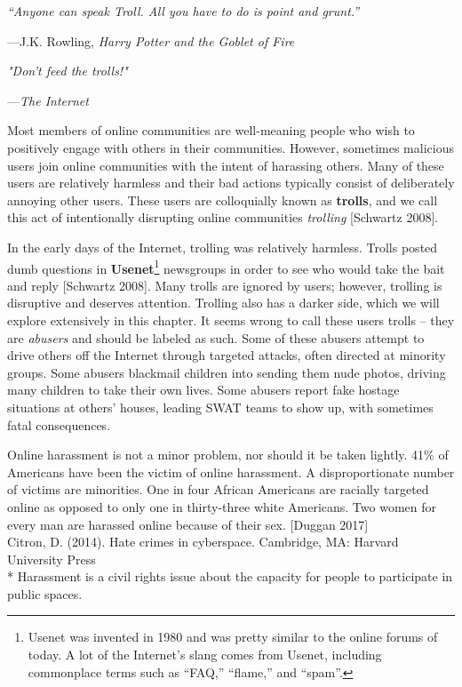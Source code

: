 \documentclass[class=book, crop=false]{standalone}
\providecommand{\keyterm}[1]{\textbf{#1}\marginnote{\scriptsize \textbf{#1}}}
\begin{document}
\epigraph{\itshape “Anyone can speak Troll. All you have to do is point and grunt.”}{---J.K. Rowling, \textit{Harry Potter and the Goblet of Fire}}

\epigraph{\itshape "Don't feed the trolls!"}{---\textit{The Internet}}

Most members of online communities are well-meaning people who wish to positively engage with others in their communities. However, sometimes malicious users join online communities with the intent of harassing others. Many of these users are relatively harmless and their bad actions typically consist of deliberately annoying other users. These users are colloquially known as \keyterm{trolls}, and we call this act of intentionally disrupting online communities \textit{trolling} [Schwartz 2008].

In the early days of the Internet, trolling was relatively harmless. Trolls posted dumb questions in \keyterm{Usenet}\footnote{Usenet was invented in 1980 and was pretty similar to the online forums of today. A lot of the Internet’s slang comes from Usenet, including commonplace terms such as “FAQ,” “flame,” and “spam”.} newsgroups in order to see who would take the bait and reply [Schwartz 2008]. Many trolls are ignored by users; however, trolling is disruptive and deserves attention. Trolling also has a darker side, which we will explore extensively in this chapter. It seems wrong to call these users trolls -- they are \textit{abusers} and should be labeled as such. Some of these abusers attempt to drive others off the Internet through targeted attacks, often directed at minority groups. Some abusers blackmail children into sending them nude photos, driving many children to take their own lives. Some abusers report fake hostage situations at others' houses, leading SWAT teams to show up, with sometimes fatal consequences.

Online harassment is not a minor problem, nor should it be taken lightly. 41\% of Americans have been the victim of online harassment. A disproportionate number of victims are minorities. One in four African Americans are racially targeted online as opposed to only one in thirty-three white Americans. Two women for every man are harassed online because of their sex. [Duggan 2017]\\

Citron, D. (2014). Hate crimes in cyberspace. Cambridge, MA: Harvard University Press\\
 * Harassment is a civil rights issue about the capacity for people to participate in public spaces.
\end{document}
